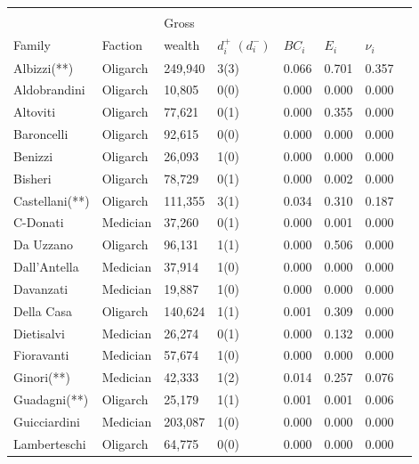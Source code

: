 \documentclass[11pt,fleqn]{article}
\begin{document}
\begin{table}
\begin{center}
\begin{tabu} to \textwidth {X[l]  X[c]  X[c]  X[c]  X[c]  X[c]	X[c]  X[c]}
\\[-1.8ex]\hline
\hline \\[-1.8ex]
       			&   		& Gross  &  &  &  & \\
Family 			& Faction	& wealth & $d^+_i$ $\left(d^-_i\right)$ & $BC_i$	&  $E_i$	&  $\nu_i$	\\ \hline
Albizzi(**)     & Oligarch	& 249,940 	& 3(3) & 0.066 & 0.701 & 0.357      \\
Aldobrandini    & Oligarch	& 10,805  	& 0(0) & 0.000 & 0.000 & 0.000      \\
Altoviti        & Oligarch	& 77,621  	& 0(1) & 0.000 & 0.355 & 0.000      \\
Baroncelli      & Oligarch	& 92,615  	& 0(0) & 0.000 & 0.000 & 0.000      \\
Benizzi         & Oligarch	& 26,093  	& 1(0) & 0.000 & 0.000 & 0.000      \\
Bisheri         & Oligarch	& 78,729  	& 0(1) & 0.000 & 0.002 & 0.000      \\
Castellani(**)  & Oligarch	& 111,355 	& 3(1) & 0.034 & 0.310 & 0.187      \\
C-Donati        & Medician	& 37,260  	& 0(1) & 0.000 & 0.001 & 0.000      \\
Da Uzzano       & Oligarch	& 96,131  	& 1(1) & 0.000 & 0.506 & 0.000      \\
Dall'Antella    & Medician	& 37,914  	& 1(0) & 0.000 & 0.000 & 0.000      \\
Davanzati       & Medician	& 19,887  	& 1(0) & 0.000 & 0.000 & 0.000      \\
Della Casa      & Oligarch	& 140,624 	& 1(1) & 0.001 & 0.309 & 0.000      \\
Dietisalvi      & Medician	& 26,274  	& 0(1) & 0.000 & 0.132 & 0.000      \\
Fioravanti      & Medician	& 57,674  	& 1(0) & 0.000 & 0.000 & 0.000      \\
Ginori(**)      & Medician	& 42,333  	& 1(2) & 0.014 & 0.257 & 0.076      \\
Guadagni(**)    & Oligarch	& 25,179  	& 1(1) & 0.001 & 0.001 & 0.006      \\
Guicciardini    & Medician	& 203,087 	& 1(0) & 0.000 & 0.000 & 0.000      \\
Lamberteschi    & Oligarch	& 64,775  	& 0(0) & 0.000 & 0.000 & 0.000      \\

\end{tabu}
\end{center}
\end{table}
\end{document}
